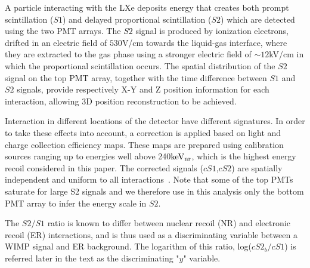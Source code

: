 A particle interacting with the LXe deposits energy that creates both
prompt scintillation ($S1$) and delayed proportional scintillation ($S2$) which are detected using the two PMT arrays. The $S2$ signal is produced by ionization electrons, drifted in an electric field of $530$V/cm towards the liquid-gas interface, where they are extracted to the gas phase using a stronger electric field of $\sim12$kV/cm in which the proportional scintillation occurs. 
The spatial distribution of the $S2$ signal on the top PMT array, together with the time difference between $S1$ and $S2$ signals, provide respectively X-Y and Z position information for each interaction, allowing 3D position reconstruction to be achieved.

Interaction in different locations of  the detector have different signatures. In order to take these effects into account, a correction is applied based on light and charge collection efficiency maps. These maps are prepared using calibration sources ranging up to energies well above 240$\mathrm{keV_\mathrm{nr}}$, which is the highest energy recoil considered in this paper. The corrected signals ($cS1$,$cS2$) are spatially independent and uniform to all interactions~\cite{xe100_instr2012}. Note that some of the top PMTs saturate for large S2 signals and we therefore use in this analysis only the bottom PMT array to infer the energy scale in $S2$.

The $S2/S1$ ratio is known to differ between nuclear recoil (NR) and electronic recoil (ER) interactions, and is thus used as a discriminating variable between a WIMP signal and ER background. The logarithm of this ratio, log($cS2_b/cS1$) is referred later in the text as the discriminating "$y$" variable.


